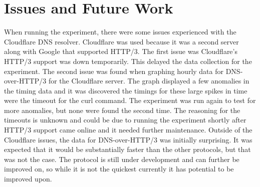 \section{Issues and Future Work}
When running the experiment, there were some issues experienced with the Cloudflare DNS resolver.  Cloudflare was used because it was a second server along with Google that supported HTTP/3.  The first issue was Cloudflare’s HTTP/3 support was down temporarily.  This delayed the data collection for the experiment.  The second issue was found when graphing hourly data for DNS-over-HTTP/3 for the Cloudflare server.  The graph displayed a few anomalies in the timing data and it was discovered the timings for these large spikes in time were the timeout for the curl command.  The experiment was run again to test for more anomalies, but none were found the second time.  The reasoning for the timeouts is unknown and could be due to running the experiment shortly after HTTP/3 support came online and it needed further maintenance.  Outside of the Cloudflare issues, the data for DNS-over-HTTP/3 was initially surprising.  It was expected that it would be substantially faster than the other protocols, but that was not the case.  The protocol is still under development and can further be improved on, so while it is not the quickest currently it has potential to be improved upon.